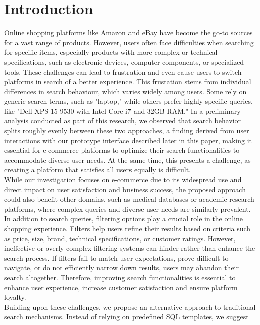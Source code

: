 \documentclass[../../submission.tex]{subfiles}
\begin{document}
\section{Introduction}
Online shopping platforms like Amazon and eBay have become the go-to sources for a vast range of products. 
However, users often face difficulties when searching for specific items, especially products with more complex or technical specifications, 
such as electronic devices, computer components, or specialized tools. These challenges can lead to frustration and even cause users to switch platforms in 
search of a better experience. This frustation stems from individual differences in search behaviour, which varies widely among users.
Some rely on generic search terms, such as "laptop," while others prefer highly specific queries, like "Dell XPS 15 9530 with Intel Core i7 and 32GB RAM." 
In a preliminary analysis conducted as part of this research, we observed that search behavior splits roughly evenly between these two approaches, a 
finding derived from user interactions with our prototype interface described later in this paper, making it essential for e-commerce platforms to optimize their search functionalities to 
accommodate diverse user needs. At the same time, this presents a challenge, as creating a platform that satisfies all users equally is difficult.\\
While our investigation focuses on e-commerce due to its widespread use and direct impact on user satisfaction and business success, the proposed approach could also 
benefit other domains, such as medical databases or academic research platforms, where complex queries and diverse user needs are similarly prevalent.\\
In addition to search queries, filtering options play a crucial role in the online shopping experience. Filters help users refine their results based on 
criteria such as price, size, brand, technical specifications, or customer ratings. However, ineffective or overly complex filtering systems can hinder rather 
than enhance the search process. If filters fail to match user expectations, prove difficult to navigate, or do not efficiently narrow down results, users may
abandon their search altogether. Therefore, improving search functionalities is essential to enhance user experience, increase customer satisfaction
and ensure platform loyalty.\\
Building upon these challenges, we propose an alternative approach to traditional search mechanisms. Instead of relying on predefined SQL templates, we suggest 
\end{document}
